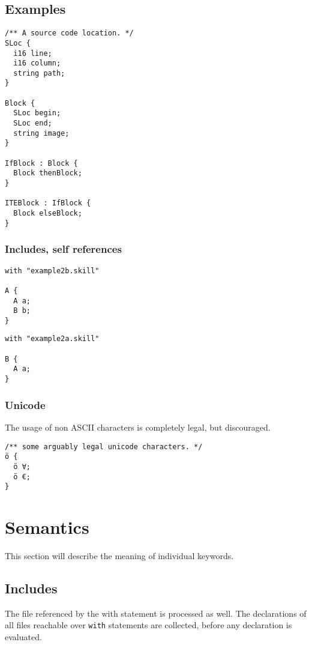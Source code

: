 \documentclass[a4paper,10pt]{article}
\begin{document}
\subsection{Examples}

\begin{lstlisting}[label=blockExample,caption=Running Example,language=skill]
/** A source code location. */
SLoc {
  i16 line;
  i16 column;
  string path;
}

Block {
  SLoc begin;
  SLoc end;
  string image;
}

IfBlock : Block {
  Block thenBlock;
}

ITEBlock : IfBlock {
  Block elseBlock;
}
\end{lstlisting}

\subsubsection*{Includes, self references}

\begin{lstlisting}[label=example2a,caption=Example 2a,language=skill]
with "example2b.skill"

A {
  A a;
  B b;
}
\end{lstlisting}

\begin{lstlisting}[label=example2b,caption=Example 2b,language=skill]
with "example2a.skill"

B {
  A a;
}
\end{lstlisting}

\subsubsection*{Unicode}
The usage of non ASCII characters is completely legal, but discouraged.
\begin{lstlisting}[label=unicode,caption=Unicode Support,language=skill]
/** some arguably legal unicode characters. */
ö {
  ö ∀;
  ö €;
}
\end{lstlisting}




\section{Semantics}

This section will describe the meaning of individual keywords.

\subsection{Includes}
The file referenced by the with statement is processed as well. The declarations of all files reachable over \texttt{with} statements are collected, before any declaration is evaluated.
\end{document}
